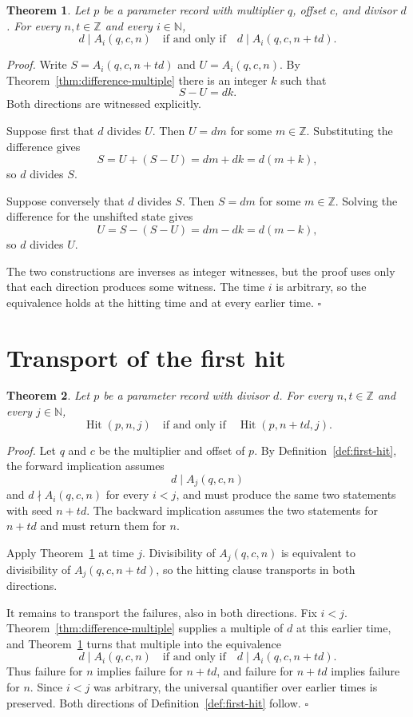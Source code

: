 \documentclass[11pt,letterpaper]{article}
\newcommand{\N}{\mathbb{N}}
\newcommand{\Z}{\mathbb{Z}}
\newtheorem{theorem}{Theorem}
\newenvironment{proof}{\noindent\textit{Proof.}}{\hfill\(\square\)}
\begin{document}
\begin{theorem}
\label{thm:divisibility-shift}
Let \(p\) be a parameter record with multiplier \(q\), offset \(c\), and
divisor \(d\). For every \(n,t\in\Z\) and every \(i\in\N\),
\[
d\mid A_i(q,c,n)
\quad\text{if and only if}\quad
d\mid A_i(q,c,n+td).
\]
\end{theorem}

\begin{proof}
Write \(S=A_i(q,c,n+td)\) and \(U=A_i(q,c,n)\). By
Theorem~\ref{thm:difference-multiple} there is an integer \(k\) such that
\[
S-U=d k.
\]
Both directions are witnessed explicitly.

Suppose first that \(d\) divides \(U\). Then \(U=dm\) for some \(m\in\Z\).
Substituting the difference gives
\[
S=U+(S-U)=dm+dk=d(m+k),
\]
so \(d\) divides \(S\).

Suppose conversely that \(d\) divides \(S\). Then \(S=dm\) for some
\(m\in\Z\). Solving the difference for the unshifted state gives
\[
U=S-(S-U)=dm-dk=d(m-k),
\]
so \(d\) divides \(U\).

The two constructions are inverses as integer witnesses, but the proof uses
only that each direction produces some witness. The time \(i\) is arbitrary,
so the equivalence holds at the hitting time and at every earlier time.
\end{proof}

\section{Transport of the first hit}

\begin{theorem}
\label{thm:first-hit-shift}
Let \(p\) be a parameter record with divisor \(d\). For every \(n,t\in\Z\) and
every \(j\in\N\),
\[
\operatorname{Hit}(p,n,j)
\quad\text{if and only if}\quad
\operatorname{Hit}(p,n+td,j).
\]
\end{theorem}

\begin{proof}
Let \(q\) and \(c\) be the multiplier and offset of \(p\). By
Definition~\ref{def:first-hit}, the forward implication assumes
\[
d\mid A_j(q,c,n)
\]
and \(d\nmid A_i(q,c,n)\) for every \(i<j\), and must produce the same two
statements with seed \(n+td\). The backward implication assumes the two
statements for \(n+td\) and must return them for \(n\).

Apply Theorem~\ref{thm:divisibility-shift} at time \(j\). Divisibility of
\(A_j(q,c,n)\) is equivalent to divisibility of \(A_j(q,c,n+td)\), so the
hitting clause transports in both directions.

It remains to transport the failures, also in both directions. Fix \(i<j\).
Theorem~\ref{thm:difference-multiple} supplies a multiple of \(d\) at this
earlier time, and Theorem~\ref{thm:divisibility-shift} turns that multiple
into the equivalence
\[
d\mid A_i(q,c,n)
\quad\text{if and only if}\quad
d\mid A_i(q,c,n+td).
\]
Thus failure for \(n\) implies failure for \(n+td\), and failure for
\(n+td\) implies failure for \(n\). Since \(i<j\) was arbitrary, the universal
quantifier over earlier times is preserved. Both directions of
Definition~\ref{def:first-hit} follow.
\end{proof}
\end{document}
